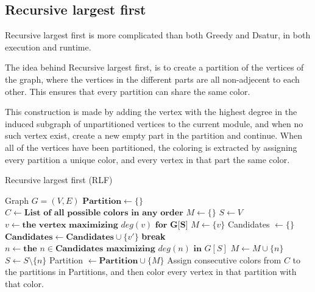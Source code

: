\documentclass{amsart}
\newcommand{\algorithmicbreak}{\textbf{break}}
\newcommand{\BREAK}{\STATE \algorithmicbreak}
\begin{document}
\subsection{Recursive largest first}

Recursive largest first is more complicated than both Greedy and Dsatur, in both
execution and runtime. 

The idea behind Recursive largest first, is to create a partition of the
vertices of the graph, where the vertices in the different parts are all
non-adjecent to each other. This ensures that every partition can share the
same color. 

This construction is made by adding the vertex with the highest degree in the induced subgraph of unpartitioned vertices to the current module, and when no
such vertex exist, create a new empty part in the partition and continue. When
all of the vertices have been partitioned, the coloring is extracted by
assigning every partition a unique color, and every vertex in that part the same
color.


\begin{algorithm}[H]
    \caption{Recursive largest first (RLF)}
  \label{alg:modmin}
  \begin{algorithmic}[1]
      \REQUIRE Graph $G = (V,E)$
      \STATE $\textbf{Partition} \leftarrow \{\}$
      \STATE $C \leftarrow \textbf{List of all possible colors in any order}$
      \STATE $M \leftarrow \{\}$
      \STATE $S \leftarrow V$
        \STATE $v \leftarrow \textbf{the vertex maximizing $deg(v)$ for G[S]} $
        \STATE $M \leftarrow \{v\}$
            \STATE Candidates $\leftarrow \{\}$
                    \STATE $\textbf{Candidates} \leftarrow \textbf{Candidates}
                    \cup \{v'\}$
                \ENDIF
            \ENDFOR
                \BREAK
            \ENDIF
            \STATE $n \leftarrow \textbf{the $n \in \textbf{Candidates}$ maximizing $deg(n)$ in $G[S]$}$ 
            \STATE $M \leftarrow M \cup \{n\}$
            \STATE $S \leftarrow S \setminus \{n\}$
        \ENDWHILE
        \STATE Partition $\leftarrow \textbf{Partition} \cup \{M\}$ 
      \ENDWHILE
      \STATE Assign consecutive colors from $C$ to the partitions in Partitions,
      and then color every vertex in that partition with that color.
  \end{algorithmic}
\end{algorithm}
\end{document}
